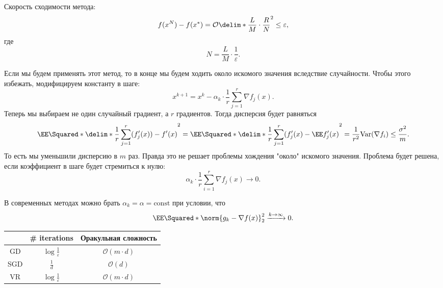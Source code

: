 \begin{example}
    Скорость сходимости метода:
   \begin{equation*}
        f(x^N) - f(x^*) = \mathcal{O}\delim*{\frac{L}{M}\cdot \frac{R}{N}}^2 \leq \varepsilon,
    \end{equation*}
    где
    \begin{equation*}
        N = \frac{L}{M}\cdot\frac{1}{\varepsilon}.
    \end{equation*}
\end{example}

Если мы будем применять этот метод, то в конце мы будем ходить около искомого значения вследствие случайности. Чтобы этого избежать, модифицируем константу в шаге:
\begin{equation*}
    x^{k + 1} = x^k - \alpha_k\cdot\frac{1}{r}\sum_{j = 1}^r \nabla f_j(x).
\end{equation*}
Теперь мы выбираем не один случайный градиент, а $r$ градиентов. Тогда дисперсия будет равняться
\begin{equation*}
    \EE \Squared*{\delim*{\frac{1}{r}\sum_{j = 1}^r (f_j'(x)) - f'(x)}^2} = \EE \Squared*{\delim*{\frac{1}{r}\sum_{j = 1}^r(f'_j(x) - \EE f_j'(x)}^2} = \frac{1}{r^2}\mathrm{Var}(\nabla f_i) \leq \frac{\sigma^2}{m}.
\end{equation*}
То есть мы уменьшили дисперсию в $m$ раз. Правда это не решает проблемы хождения "около"{} искомого значения. Проблема будет решена, если коэффициент в шаге будет стремиться к нулю:
\begin{equation*}
    \alpha_k\cdot \frac{1}{r}\sum_{i = 1}^r \nabla f_j(x) \to 0.
\end{equation*}

В современных методах можно брать $\alpha_k = \alpha = \mathrm{const}$ при условии, что
\begin{equation*}
    \EE \Squared*{\norm{g_k - \nabla f(x)}_2^2} \xrightarrow{k \to \infty} 0. \label{conv-cond}
\end{equation*}

\begin{table}[]
    \centering
    \bgroup
    \def\arraystretch{2.25}
    \begin{tabular}{|c|c|c|}
        \hline
        {} & \# iterations & Оракульная сложность \\
        \hline
        GD & $\displaystyle \log \frac{1}{\varepsilon}$ & $\mathcal{O} (m\cdot d)$ \\
        \hline
        SGD & $\displaystyle \frac{1}{d}$ & $\mathcal{O} (d)$ \\
        \hline
        VR & $\displaystyle \log \frac{1}{\varepsilon}$ & $\mathcal{O} (m\cdot d)$ \\
        \hline
    \end{tabular}
    \egroup
    \label{tab:sgd-comp}
\end{table}

